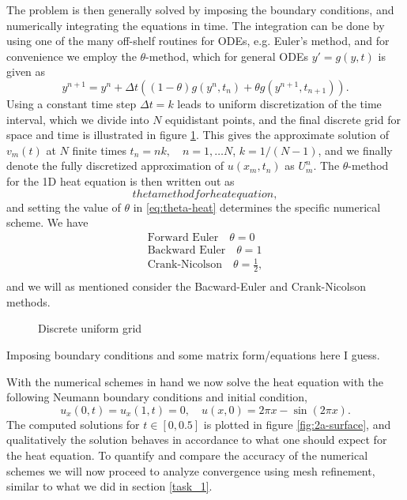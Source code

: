 The problem is then generally solved by imposing the boundary conditions, 
and numerically integrating the equations in time. 
The integration can be done by using one of the many off-shelf routines for ODEs, 
e.g. Euler's method,  
and for convenience we employ the $\theta$-method, 
which for general ODEs $y' = g(y, t)$ is given as
\begin{equation*}
    y^{n+1} = y^n + \Delta t ((1-\theta)g(y^n, t_n)+\theta g(y^{n+1}, t_{n+1})). 
\end{equation*}
Using a constant time step $\Delta t = k$ leads to uniform discretization of the time interval, 
which we divide into $N$ equidistant points, 
and the final discrete grid for space and time is illustrated in figure \ref{fig:2-uniform-grid}.
This gives the approximate solution of $v_m(t)$ at $N$ finite times $t_n = nk, \quad n = 1, \ldots N$, 
\quad $k = 1/(N-1)$, 
and we finally denote the fully discretized approximation of $u(x_m, t_n)$ as $U_{m}^{n}$. 
The $\theta$-method for the 1D heat equation is then written out as
\begin{equation}
    theta method for heat equation, 
    \label{eq:theta-heat}
\end{equation}
and setting the value of $\theta$ in \eqref{eq:theta-heat} determines the specific numerical scheme. 
We have
\begin{equation*}
\begin{split}
    \text{Forward Euler} \quad \theta = 0 \\
    \text{Backward Euler} \quad \theta = 1 \\
    \text{Crank-Nicolson} \quad \theta = \frac{1}{2}, \\
\end{split}
\end{equation*}
and we will as mentioned consider the Bacward-Euler and Crank-Nicolson methods. 

\begin{figure}[ht]
    \centering
    
    \caption{Discrete uniform grid}
    \label{fig:2-uniform-grid}
\end{figure}

Imposing boundary conditions and some matrix form/equations here I guess.

With the numerical schemes in hand we now solve the heat equation with the following Neumann boundary conditions and initial condition, 
\begin{equation}
    u_x(0,t) = u_x(1,t) = 0, \quad u(x,0) = 2\pi x - \sin(2\pi x). 
    \label{eq:2a}
\end{equation}
The computed solutions for $t \in [0, 0.5]$ is plotted in figure \ref{fig:2a-surface}, 
and qualitatively the solution behaves in accordance to what one should expect for the heat equation. 
To quantify and compare the accuracy of the numerical schemes we will now proceed to analyze convergence using mesh refinement, 
similar to what we did in section \ref{task_1}. 

